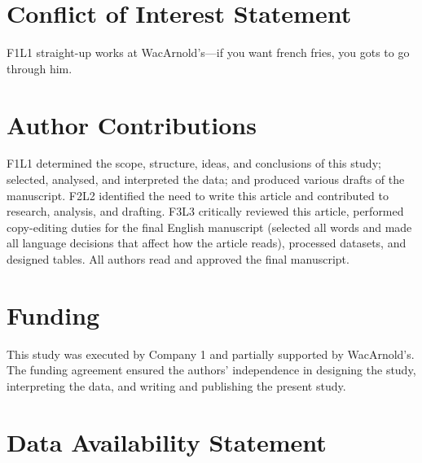 \documentclass[utf8]{FrontiersinVancouver} %
\begin{document}
\section*{Conflict of Interest Statement}

F1L1 straight-up works at WacArnold's---if you want french fries, you gots to go through him.

\section*{Author Contributions}

F1L1 determined the scope, structure, ideas, and conclusions of this study; selected, analysed, and
interpreted the data; and produced various drafts of the manuscript. F2L2 identified the need to
write this article and contributed to research, analysis, and drafting. F3L3 critically reviewed
this article, performed copy-editing duties for the final English manuscript (selected all words
and made all language decisions that affect how the article reads), processed datasets, and
designed tables. All authors read and approved the final manuscript.

\section*{Funding}

This study was executed by Company 1 and partially supported by WacArnold's. 
The funding agreement ensured the authors' independence in designing the study, interpreting the
data, and writing and publishing the present study.



\section*{Data Availability Statement}
\end{document}

